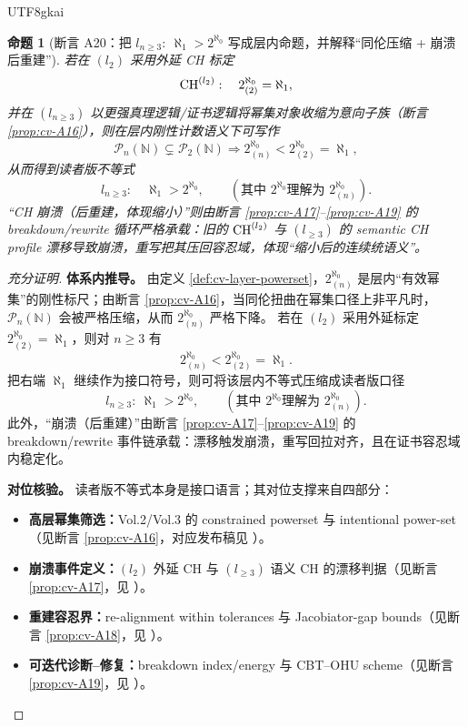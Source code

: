 \documentclass[12pt]{article}
\newtheorem{proposition}{命题}[section]
\begin{document}
\begin{CJK*}{UTF8}{gkai}
\begin{proposition}[断言 A20：把 $l_{n\ge3}:\ \aleph_1>2^{\aleph_0}$ 写成层内命题，并解释“同伦压缩 + 崩溃后重建”]\label{prop:cv-A20}
若在 $(l_2)$ 采用外延 CH 标定
\[
  \mathrm{CH}^{(l_2)}:\quad 2^{\aleph_0}_{(2)}=\aleph_1,
\]
并在 $(l_{n\ge3})$ 以更强真理逻辑/证书逻辑将幂集对象收缩为意向子族（断言 \ref{prop:cv-A16}），则在层内刚性计数语义下可写作
\[
  \mathcal P_n(\mathbb N)\subsetneq\mathcal P_2(\mathbb N)
  \Longrightarrow
  2^{\aleph_0}_{(n)}<2^{\aleph_0}_{(2)}=\aleph_1,
\]
从而得到读者版不等式
\[
  l_{n\ge3}:\quad \aleph_1>2^{\aleph_0},
  \qquad(\text{其中 }2^{\aleph_0}\text{理解为 }2^{\aleph_0}_{(n)}).
\]
“CH 崩溃（后重建，体现缩小）”则由断言 \ref{prop:cv-A17}--\ref{prop:cv-A19} 的 breakdown/rewrite 循环严格承载：旧的 $\mathrm{CH}^{(l_2)}$ 与 $(l_{\ge3}
  )$ 的 semantic CH profile 漂移导致崩溃，重写把其压回容忍域，体现“缩小后的连续统语义”。
\end{proposition}

\begin{proof}[充分证明]
\textbf{体系内推导。}
由定义 \ref{def:cv-layer-powerset}，$2^{\aleph_0}_{(n)}$ 是层内“有效幂集”的刚性标尺；由断言 \ref{prop:cv-A16}，当同伦扭曲在幂集口径上非平凡时，$\mathcal
  P_n(\mathbb N)$ 会被严格压缩，从而 $2^{\aleph_0}_{(n)}$ 严格下降。
若在 $(l_2)$ 采用外延标定 $2^{\aleph_0}_{(2)}=\aleph_1$，则对 $n\ge3$ 有
\[
  2^{\aleph_0}_{(n)}<2^{\aleph_0}_{(2)}=\aleph_1.
\]
把右端 $\aleph_1$ 继续作为接口符号，则可将该层内不等式压缩成读者版口径
\[
  l_{n\ge3}:\ \aleph_1>2^{\aleph_0},
  \qquad(\text{其中 }2^{\aleph_0}\text{理解为 }2^{\aleph_0}_{(n)}).
\]
此外，“崩溃（后重建）”由断言 \ref{prop:cv-A17}--\ref{prop:cv-A19} 的 breakdown/rewrite 事件链承载：漂移触发崩溃，重写回拉对齐，且在证书容忍域内稳定化。

\textbf{对位核验。}
读者版不等式本身是接口语言；其对位支撑来自四部分：
\begin{itemize}
  \item \textbf{高层幂集筛选：}Vol.2/Vol.3 的 constrained powerset 与 intentional power-set（见断言 \ref{prop:cv-A16}，对应发布稿见
    \cite{GaoZhengAppVol2,GaoZhengAppVol3}）。
  \item \textbf{崩溃事件定义：}$(l_2)$ 外延 CH 与 $(l_{\ge3})$ 语义 CH 的漂移判据（见断言 \ref{prop:cv-A17}，见 \cite{GaoZheng2025GFramework}）。
  \item \textbf{重建容忍界：}re-alignment within tolerances 与 Jacobiator-gap bounds（见断言 \ref{prop:cv-A18}，见
    \cite{GaoZheng2025GFramework}）。
  \item \textbf{可迭代诊断--修复：}breakdown index/energy 与 CBT--OHU scheme（见断言 \ref{prop:cv-A19}，见 \cite{GaoZheng2025GFramework}
    ）。
\end{itemize}
\end{proof}


\end{CJK*}
\end{document}
